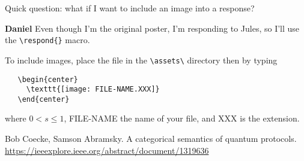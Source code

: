 \documentclass{amsart}
\newcommand{\respond}[1]{
  \vspace{1em} \textbf{#1}
}
\begin{document}
Quick question: what if I want to include an image into a
response?

\respond{Daniel} Even though I'm the original poster, I'm
responding to Jules, so I'll use the \verb|\respond{}|
macro.

To include images, place the file in the \verb|\assets\|
directory then by typing
\begin{verbatim}
   \begin{center}
     \texttt{[image: FILE-NAME.XXX]}
   \end{center}
\end{verbatim}
where $ 0< s \leq 1 $, FILE-NAME the name of your file, and XXX is the
extension. 




%


\begin{thebibliography}{99}

 Bob Coecke, Samson Abramsky. A categorical
  semantics of quantum protocols. \url{https://ieeexplore.ieee.org/abstract/document/1319636} 

\end{thebibliography}
\end{document}
